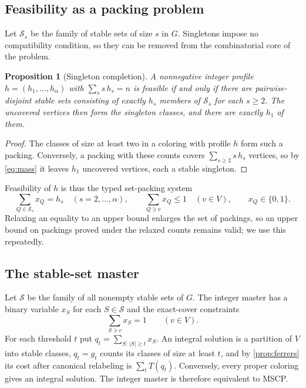 \documentclass[11pt]{article}
\newtheorem{proposition}[theorem]{Proposition}
\theoremstyle{definition}
\newcommand{\Stable}{\mathcal{S}}
\begin{document}
\subsection{Feasibility as a packing problem}

Let $\Stable_s$ be the family of stable sets of size $s$ in $G$. Singletons
impose no compatibility condition, so they can be removed from the
combinatorial core of the problem.

\begin{proposition}[Singleton completion]
\label{prop:singleton}
A nonnegative integer profile $h=(h_1,\ldots,h_\alpha)$ with
$\sum_s s\,h_s=n$ is feasible if and only if there are pairwise-disjoint stable
sets consisting of exactly $h_s$ members of $\Stable_s$ for each $s\ge2$.
The uncovered vertices then form the singleton classes, and there are exactly
$h_1$ of them.
\end{proposition}

\begin{proof}
The classes of size at least two in a coloring with profile $h$ form such a
packing. Conversely, a packing with these counts covers $\sum_{s\ge2}s\,h_s$
vertices, so by \eqref{eq:mass} it leaves $h_1$ uncovered vertices, each a
stable singleton.
\end{proof}

Feasibility of $h$ is thus the typed set-packing system
\[
  \sum_{Q\in\Stable_s}x_Q=h_s\quad(s=2,\ldots,\alpha),\qquad
  \sum_{Q\ni v}x_Q\le1\quad(v\in V),\qquad
  x_Q\in\{0,1\}.
\]
Relaxing an equality to an upper bound enlarges the set of packings, so an
upper bound on packings proved under the relaxed counts remains valid; we use
this repeatedly.

\subsection{The stable-set master}
\label{sec:master}

Let $\Stable$ be the family of all nonempty stable sets of $G$. The integer
master has a binary variable $x_S$ for each $S\in\Stable$ and the exact-cover
constraints
\begin{equation}
  \sum_{S\ni v}x_S=1\qquad(v\in V).
  \label{eq:master-cover}
\end{equation}
For each threshold $t$ put $q_t=\sum_{S:\,|S|\ge t}x_S$. An integral solution
is a partition of $V$ into stable classes, $q_t=g_t$ counts its classes of
size at least $t$, and by \cref{prop:ferrers} its cost after canonical
relabeling is $\sum_tT(q_t)$. Conversely, every proper coloring gives an
integral solution. The integer master is therefore equivalent to MSCP.
\end{document}
